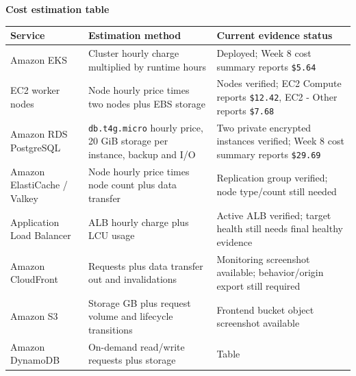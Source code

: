 \vspace{0.5em}\noindent\textbf{Cost estimation table}\par

{
\begingroup
\small
\setlength{\tabcolsep}{3pt}
\renewcommand{\arraystretch}{1.15}
\begin{longtable}{@{}
  >{\raggedright\arraybackslash}p{}
  >{\raggedright\arraybackslash}p{}
  >{\raggedright\arraybackslash}p{}@{}}
\toprule\noalign{}
\begin{minipage}[b]{\linewidth}\raggedright
Service
\end{minipage} & \begin{minipage}[b]{\linewidth}\raggedright
Estimation method
\end{minipage} & \begin{minipage}[b]{\linewidth}\raggedright
Current evidence status
\end{minipage} \\
\midrule\noalign{}
\endhead
\bottomrule\noalign{}
\endlastfoot
Amazon EKS & Cluster hourly charge multiplied by runtime hours &
Deployed; Week 8 cost summary reports \texttt{\$5.\allowbreak{}64} \\
EC2 worker nodes & Node hourly price times two nodes plus EBS storage &
Nodes verified; EC2 Compute reports \texttt{\$12.\allowbreak{}42}, EC2 - Other
reports \texttt{\$7.\allowbreak{}68} \\
Amazon RDS PostgreSQL & \texttt{db.\allowbreak{}t4g.\allowbreak{}micro} hourly price, 20 GiB
storage per instance, backup and I/O & Two private encrypted instances
verified; Week 8 cost summary reports \texttt{\$29.\allowbreak{}69} \\
Amazon ElastiCache / Valkey & Node hourly price times node count plus
data transfer & Replication group verified; node type/count still
needed \\
Application Load Balancer & ALB hourly charge plus LCU usage & Active
ALB verified; target health still needs final healthy evidence \\
Amazon CloudFront & Requests plus data transfer out and invalidations &
Monitoring screenshot available; behavior/origin export still
required \\
Amazon S3 & Storage GB plus request volume and lifecycle transitions &
Frontend bucket object screenshot available \\
Amazon DynamoDB & On-demand read/write requests plus storage & Table

\end{longtable}}
